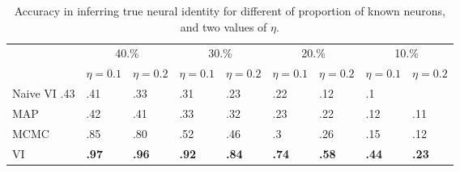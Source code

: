 \documentclass{article}
\begin{document}
\begin{table}[h]
   \centering
  \begin{tabular}{lllllllll}
    & \multicolumn{2}{c}{40.\%} & \multicolumn{2}{c}{30.\%} & \multicolumn{2}{c}{20.\%} & \multicolumn{2}{c}{10.\%}\\
    \cmidrule(lr){2-3} \cmidrule(lr){4-5} \cmidrule(lr){6-7} \cmidrule(lr){8-9}
     & $\eta=0.1$ & $\eta=0.2$ & $\eta=0.1$ & $\eta=0.2$  & $\eta=0.1$ & $\eta=0.2$  & $\eta=0.1$ & $\eta=0.2$ \\
    \midrule 
    Naive VI .43 & .41 & .33 & .31 & .23 & .22 & .12 & .1 \\
    MAP & .42 & .41  &.33 &.32& .23 & .22 & .12 & .11 \\
     MCMC   & .85 & .80  &.52 &.46& .3 & .26 & .15 & .12 \\
    VI   & \textbf{.97} & \textbf{.96} & \textbf{.92} & \textbf{.84} & \textbf{.74} & \textbf{.58} & \textbf{.44} & \textbf{.23} \\
              \bottomrule
  \end{tabular}
   \caption{Accuracy in inferring true neural identity for different of proportion of known neurons, and two values of $\eta$. }%
   \label{table:celegans}
\end{table}
\clearpage



\end{document}
